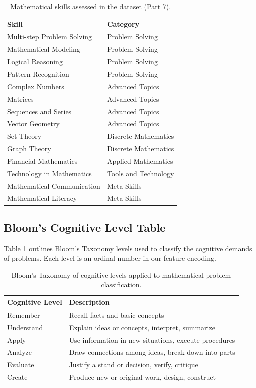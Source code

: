 \documentclass[11pt]{article}
\begin{document}
\begin{table}
\centering
\caption{Mathematical skills assessed in the dataset (Part 7).}
\begin{tabular}{p{}p{}}
\toprule
\textbf{Skill} & \textbf{Category} \\
\midrule
Multi-step Problem Solving & Problem Solving \\
Mathematical Modeling & Problem Solving \\
Logical Reasoning & Problem Solving \\
Pattern Recognition & Problem Solving \\
Complex Numbers & Advanced Topics \\
Matrices & Advanced Topics \\
Sequences and Series & Advanced Topics \\
Vector Geometry & Advanced Topics \\
Set Theory & Discrete Mathematics \\
Graph Theory & Discrete Mathematics \\
Financial Mathematics & Applied Mathematics \\
Technology in Mathematics & Tools and Technology \\
Mathematical Communication & Meta Skills \\
Mathematical Literacy & Meta Skills \\
\bottomrule
\end{tabular}
\end{table}

\subsection{Bloom's Cognitive Level Table}
Table \ref{tab:blooms-taxonomy} outlines Bloom's Taxonomy levels used to classify the cognitive demands of problems. Each level is an ordinal number in our feature encoding.
\begin{table}[!ht] %
    \centering
    \begin{tabular}{p{}p{}} %
        \toprule %
        \textbf{Cognitive Level} & \textbf{Description} \\
        \midrule %
        Remember & Recall facts and basic concepts \\
        Understand & Explain ideas or concepts, interpret, summarize \\
        Apply & Use information in new situations, execute procedures \\
        Analyze & Draw connections among ideas, break down into parts \\
        Evaluate & Justify a stand or decision, verify, critique \\
        Create & Produce new or original work, design, construct \\
        \bottomrule %
    \end{tabular}
    \caption{Bloom's Taxonomy of cognitive levels applied to mathematical problem classification.}
    \label{tab:blooms-taxonomy}
\end{table}
\end{document}
